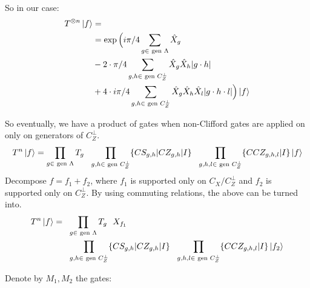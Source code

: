 \documentclass[manuscript,screen,review]{acmart}
\begin{document}
So in our case: 
\begin{equation*}
  \begin{split}
    T^{\otimes n}\ket{f} & = \\
    & = \exp \Big( i\pi/4 \sum_{g \in \text{ gen }\Lambda } \hat{X}_{g}  \\
    \ifdefined\MORECALC & -  2 \cdot \pi/4 \sum_{g \in \text{ gen }\Lambda ,h} 2 \hat{X}_{g}\hat{X}_{h} \\ \fi 
    & -  2 \cdot \pi/4 \sum_{g ,h \in \text{ gen } C_{Z}^{\perp}} \hat{X}_{g}\hat{X}_{h}|g\cdot h| \\
   \ifdefined\MORECALC & +  \cancel{4 \cdot i\pi/4 \sum_{g \in \Lambda ,h} \hat{X}_{g}\hat{X}_{h}\hat{X}_{l}2} \\ \fi
 & +  4 \cdot i\pi/4 \sum_{g,h \in \text{ gen } C_{Z}^{\perp}} \hat{X}_{g}\hat{X}_{h}\hat{X}_{l}|g\cdot h \cdot l|  \Big) \ket{f}
  \end{split}
\end{equation*}


So eventually, we have a product of gates when non-Clifford gates are applied on only on generators of $C_{Z}^{\perp}$.
\begin{equation*}
  \begin{split}
    T^{n}\ket{f} = \prod_{g \in \text{ gen }\Lambda} T_{g} \ \ \ifdefined\MORECALC \prod_{g \in \text{ gen }\Lambda, h} \{ CZ_{g,h} | I \} \ \ \fi \prod_{g ,h \in \text{ gen }C_{Z}^{\perp}} \{ CS_{g,h} | CZ_{g,h} | I \} \ \ \prod_{g ,h, l \in \text{ gen }C_{Z}^{\perp}} \{ CCZ_{g,h,l} | I \} \ket{f}
  \end{split}
\end{equation*}
Decompose $f = f_{1} + f_{2}$, where $f_{1}$ is supported only on $C_{X}/C^{\perp}_{Z}$ and $f_{2}$ is supported only on $C_{Z}^{\perp}$. By using commuting relations, the above can be turned into.
\begin{equation*}
  \begin{split}
    T^{n}\ket{f} = & \ifdefined\MORECALC \prod_{g \in \text{ gen }\Lambda, h} \{ CZ_{g,h} | I \} \fi \ \ \prod_{g \in \text{ gen }\Lambda} T_{g} \ \  X_{f_{1}} \\
    &  \ \ \prod_{g ,h \in \text{ gen }C_{Z}^{\perp}} \{ CS_{g,h} | CZ_{g,h} | I \} \ \ \prod_{g ,h, l \in \text{ gen }C_{Z}^{\perp}} \{ CCZ_{g,h,l} | I \} \ket{f_2}
  \end{split}
\end{equation*}

Denote by $M_1, M_2$ the gates: 
\end{document}
